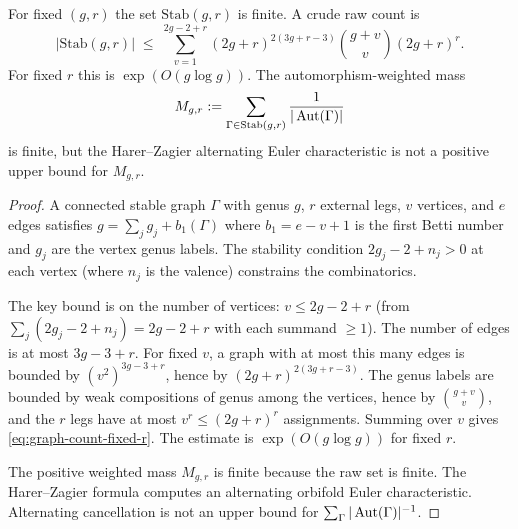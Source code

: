 \begin{proposition}
\label{prop:graph-count-polynomial}
For fixed $(g,r)$ the set $\mathrm{Stab}(g,r)$ is finite. A crude
raw count is
\begin{equation}\label{eq:graph-count-fixed-r}
|\mathrm{Stab}(g,r)|
\;\leq\;
\sum_{v=1}^{2g-2+r}
(2g+r)^{2(3g+r-3)}
\binom{g+v}{v}
(2g+r)^r .
\end{equation}
For fixed $r$ this is $\exp(O(g\log g))$. The automorphism-weighted
mass
\[
M_{g,r}:=
\sum_{\Gamma\in \mathrm{Stab}(g,r)}
\frac{1}{|\operatorname{Aut}(\Gamma)|}
\]
is finite, but the Harer--Zagier alternating Euler characteristic is
not a positive upper bound for $M_{g,r}$.
\end{proposition}

\begin{proof}
A connected stable graph $\Gamma$ with genus $g$, $r$ external
legs, $v$ vertices, and $e$ edges satisfies
$g = \sum_j g_j + b_1(\Gamma)$ where $b_1 = e - v + 1$ is the
first Betti number and $g_j$ are the vertex genus labels. The
stability condition $2g_j - 2 + n_j > 0$ at each vertex (where
$n_j$ is the valence) constrains the combinatorics.

The key bound is on the number of vertices: $v \leq 2g - 2 + r$
(from $\sum_j (2g_j - 2 + n_j) = 2g - 2 + r$ with each summand
$\geq 1$). The number of edges is at most $3g-3+r$. For fixed
$v$, a graph with at most this many edges is bounded by
$(v^2)^{3g-3+r}$, hence by
$(2g+r)^{2(3g+r-3)}$. The genus labels are bounded by weak
compositions of genus among the vertices, hence by
$\binom{g+v}{v}$, and the $r$ legs have at most
$v^r\leq (2g+r)^r$ assignments. Summing over $v$ gives
\eqref{eq:graph-count-fixed-r}. The estimate is
$\exp(O(g\log g))$ for fixed $r$.

The positive weighted mass $M_{g,r}$ is finite because the raw set is
finite. The Harer--Zagier formula computes an alternating orbifold
Euler characteristic. Alternating cancellation is not an upper bound
for $\sum_\Gamma |\operatorname{Aut}(\Gamma)|^{-1}$.
\end{proof}

